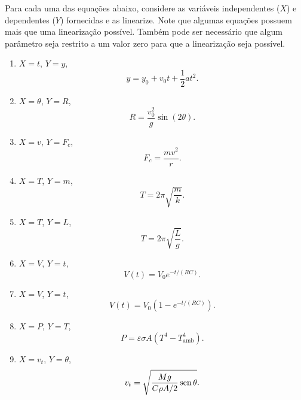 \begin{question}[type={exam}]
Para cada uma das equações abaixo, considere as variáveis independentes ($X$) e dependentes ($Y$) fornecidas e as linearize. Note que algumas equações possuem mais que uma linearização possível. Também pode ser necessário que algum parâmetro seja restrito a um valor zero para que a linearização seja possível.

\begin{enumerate}[label=\roman*.]

    \item $X = t$, $Y = y$,
    \begin{equation}
        y = y_0 + v_0 t + \frac{1}{2}at^2.
    \end{equation}

    \item $X = \theta$, $Y = R$,
    \begin{equation}
        R = \frac{v_0^2}{g}\sin(2\theta).
    \end{equation}

    \item $X = v$, $Y = F_c$,
    \begin{equation}
        F_c = \frac{mv^2}{r}.
    \end{equation}

    \item $X = T$, $Y = m$,
    \begin{equation}
        T = 2\pi\sqrt{\frac{m}{k}}.
    \end{equation}

    \item $X = T$, $Y = L$,
    \begin{equation}
        T = 2\pi\sqrt{\frac{L}{g}}.
    \end{equation}

    \item $X = V$, $Y = t$,
    \begin{equation}
        V(t) = V_0 e^{-t/(RC)}.
    \end{equation}

    \item $X = V$, $Y = t$,
    \begin{equation}
        V(t) = V_0\left(1-e^{-t/(RC)}\right).
    \end{equation}

    \item $X = P$, $Y = T$,
    \begin{equation}
        P = \varepsilon \sigma A
        \left(T^4-T_{\mathrm{amb}}^4\right).
    \end{equation}

    \item $X = v_t$, $Y = \theta$,
    \begin{equation}
        v_t = \sqrt{\frac{Mg}{C\rho A/2} \operatorname{sen}\theta}.
    \end{equation}

\end{enumerate}
\end{question}

